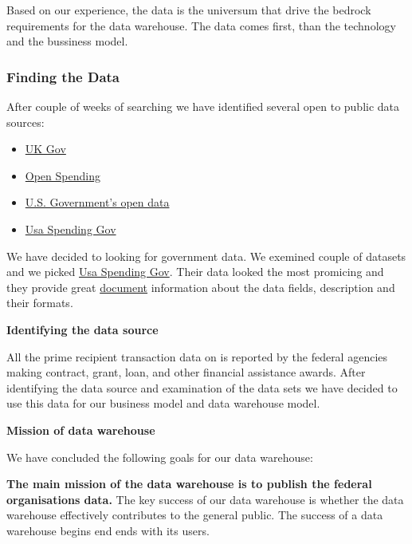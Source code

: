 \documentclass[letterpaper,12pt,oneside]{sphinxmanual}
\begin{document}
Based on our experience, the data is the universum that drive the bedrock requirements for
the data warehouse. The data comes first, than the technology and the bussiness model.


\subsubsection{Finding the Data}
\label{datawarehouse:finding-the-data}
After couple of weeks of searching we have identified several open to public data sources:
\begin{itemize}
\item {} 
\href{https://www.gov.uk}{UK Gov}

\item {} 
\href{https://openspending.org}{Open Spending}

\item {} 
\href{https://www.data.gov}{U.S. Government’s open data}

\item {} 
\href{https://www.usaspending.gov/Pages/Default.aspx}{Usa Spending Gov}

\end{itemize}

We have decided to looking for government data. We exemined couple of datasets and
we picked \href{https://www.usaspending.gov/Pages/Default.aspx}{Usa Spending Gov}.
Their data looked the most promicing and they provide great
\href{https://www.usaspending.gov/about/PublishingImages/Pages/TheData/USAspending.gov\%20Data\%20Dictionary.pdf}{document}
information about the data fields, description and their formats.

\textbf{Identifying the data source}

All the prime recipient transaction data on 
is reported by the federal agencies making contract, grant, loan, and other financial assistance awards.
After identifying the data source and examination of the data sets we have decided to use this data
for our business model and data warehouse model.

\textbf{Mission of data warehouse}

We have concluded the following goals for our data warehouse:

\textbf{The main mission of the data warehouse is to publish the federal organisations data.}
The key success of our data warehouse is whether the data warehouse effectively contributes to the general public.
The success of a data warehouse begins end ends with its users.
\end{document}
